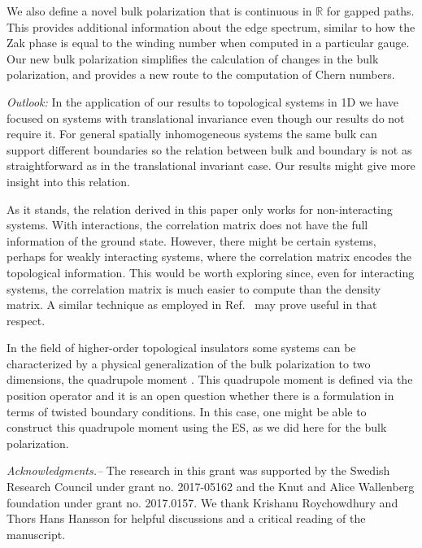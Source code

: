 \documentclass[twocolumn,amsmath,longbibliography,amssymb,superscriptaddress]{revtex4-1}
\begin{document}
We also define a novel bulk polarization that is continuous in $\mathbb{R}$ for gapped paths. This provides additional information about the edge spectrum, similar to how the Zak phase is equal to the winding number when computed in a particular gauge. Our new bulk polarization simplifies the calculation of changes in the bulk polarization, and provides a new route to the computation of Chern numbers.

\emph{Outlook:} In the application of our results to topological systems in 1D we have focused on systems with translational invariance even though our results do not require it. For general spatially inhomogeneous systems the same bulk can support different boundaries so the relation between bulk and boundary is not as straightforward as in the translational invariant case. Our results might give more insight into this relation. 

As it stands, the relation derived in this paper only works for non-interacting systems. With interactions, the correlation matrix does not have the full information of the ground state. However, there might be certain systems, perhaps for weakly interacting systems, where the correlation matrix encodes the topological information. This would be worth exploring since, even for interacting systems, the correlation matrix is much easier to compute than the density matrix. A similar technique as employed in Ref.~\cite{Wang2012simplified,wang2013topological} may prove useful in that respect. 

In the field of higher-order topological insulators some systems can be characterized by a physical generalization of the bulk polarization to two dimensions, the quadrupole moment \cite{Benalcazar2017,Kang2019}. This quadrupole moment is defined via the position operator and it is an open question whether there is a formulation in terms of twisted boundary conditions. In this case, one might be able to construct this quadrupole moment using the ES, as we did
 here for the bulk polarization.

\acknowledgments
{\em Acknowledgments.--} 
The research in this grant was supported by the Swedish Research Council under grant no. 2017-05162 and the Knut and Alice Wallenberg foundation under grant no. 2017.0157. 
We thank Krishanu Roychowdhury and Thors Hans Hansson for helpful discussions and a critical reading of the manuscript. 

	

	
\appendix

\end{document}
